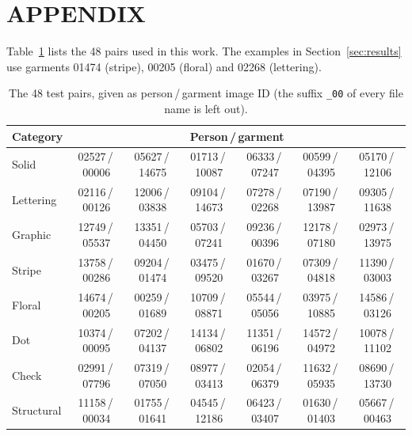 \section*{\uppercase{Appendix}}

Table~\ref{tab:pairs} lists the 48 pairs used in this work. The examples in Section~\ref{sec:results} use garments 01474 (stripe), 00205 (floral) and 02268 (lettering).
\\
\begin{table}[t]
  \centering
  \caption{The 48 \vitonhd test pairs, given as person\,/\,garment image ID (the suffix \texttt{\_00} of every file name is left out).}
  \label{tab:pairs}
  \footnotesize
  \begin{tabular}{lcccccc}
  \toprule
  Category & \multicolumn{6}{c}{Person\,/\,garment} \\
  \midrule
  Solid & 02527\,/\,00006 & 05627\,/\,14675 & 01713\,/\,10087 & 06333\,/\,07247 & 00599\,/\,04395 & 05170\,/\,12106 \\
  Lettering & 02116\,/\,00126 & 12006\,/\,03838 & 09104\,/\,14673 & 07278\,/\,02268 & 07190\,/\,13987 & 09305\,/\,11638 \\
  Graphic & 12749\,/\,05537 & 13351\,/\,04450 & 05703\,/\,07241 & 09236\,/\,00396 & 12178\,/\,07180 & 02973\,/\,13975 \\
  Stripe & 13758\,/\,00286 & 09204\,/\,01474 & 03475\,/\,09520 & 01670\,/\,03267 & 07309\,/\,04818 & 11390\,/\,03003 \\
  Floral & 14674\,/\,00205 & 00259\,/\,01689 & 10709\,/\,08871 & 05544\,/\,05056 & 03975\,/\,10885 & 14586\,/\,03126 \\
  Dot & 10374\,/\,00095 & 07202\,/\,04137 & 14134\,/\,06802 & 11351\,/\,06196 & 14572\,/\,04972 & 10078\,/\,11102 \\
  Check & 02991\,/\,07796 & 07319\,/\,07050 & 08977\,/\,03413 & 02054\,/\,06379 & 11632\,/\,05935 & 08690\,/\,13730 \\
  Structural & 11158\,/\,00034 & 01755\,/\,01641 & 04545\,/\,12186 & 06423\,/\,03407 & 01630\,/\,01403 & 05667\,/\,00463 \\
  \bottomrule
  \end{tabular}
\end{table}

